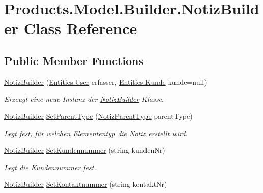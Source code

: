 \hypertarget{class_products_1_1_model_1_1_builder_1_1_notiz_builder}{}\section{Products.\+Model.\+Builder.\+Notiz\+Builder Class Reference}
\label{class_products_1_1_model_1_1_builder_1_1_notiz_builder}
\subsection*{Public Member Functions}
\begin{DoxyCompactItemize}
\item 
\hyperlink{class_products_1_1_model_1_1_builder_1_1_notiz_builder_a7ca2fecfa06f04181cfac6b3f12c19b7}{Notiz\+Builder} (\hyperlink{class_products_1_1_model_1_1_entities_1_1_user}{Entities.\+User} erfasser, \hyperlink{class_products_1_1_model_1_1_entities_1_1_kunde}{Entities.\+Kunde} kunde=null)
\begin{DoxyCompactList}\small\item\em Erzeugt eine neue Instanz der \hyperlink{class_products_1_1_model_1_1_builder_1_1_notiz_builder}{Notiz\+Builder} Klasse. \end{DoxyCompactList}\item 
\hyperlink{class_products_1_1_model_1_1_builder_1_1_notiz_builder}{Notiz\+Builder} \hyperlink{class_products_1_1_model_1_1_builder_1_1_notiz_builder_ad3b69964f01de544ceaee9b57dcf83ce}{Set\+Parent\+Type} (\hyperlink{namespace_products_1_1_model_aa53a12ac8a17bed12c76a466aeeba94d}{Notiz\+Parent\+Type} parent\+Type)
\begin{DoxyCompactList}\small\item\em Legt fest, für welchen Elemententyp die Notiz erstellt wird. \end{DoxyCompactList}\item 
\hyperlink{class_products_1_1_model_1_1_builder_1_1_notiz_builder}{Notiz\+Builder} \hyperlink{class_products_1_1_model_1_1_builder_1_1_notiz_builder_a97c6bbd0b87234c9718215eaf4b0f8ca}{Set\+Kundennummer} (string kunden\+Nr)
\begin{DoxyCompactList}\small\item\em Legt die Kundennummer fest. \end{DoxyCompactList}\item 
\hyperlink{class_products_1_1_model_1_1_builder_1_1_notiz_builder}{Notiz\+Builder} \hyperlink{class_products_1_1_model_1_1_builder_1_1_notiz_builder_a507d292ca35e6218e34e028f66d6c7e9}{Set\+Kontaktnummer} (string kontakt\+Nr)

\end{DoxyCompactItemize}
